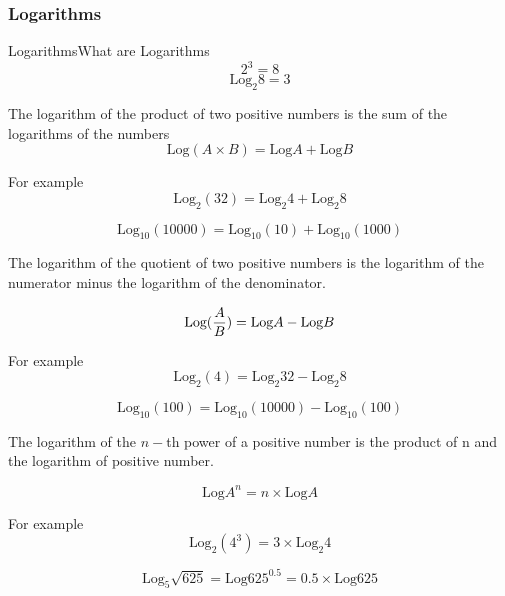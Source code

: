 \frametitle{Logarithms}
{Logarithms}{What are Logarithms}
\Large
\[ 2^3 =8 \]
\[ \mbox{Log}_2 8 = 3 \]




The logarithm of the product of two positive numbers is the sum of the logarithms of the numbers
\[ \mbox{Log}(A\times B) =  \mbox{Log}A +  \mbox{Log}B \]

For example
\[ \mbox{Log}_2(32) =  \mbox{Log}_2 4 +  \mbox{Log}_2 8 \]

\[ \mbox{Log}_{10}(10000) =  \mbox{Log}_{10}(10) +  \mbox{Log}_{10}(1000) \]


The logarithm of the quotient of two positive numbers is the logarithm of the numerator minus the logarithm of the 
denominator.

\[ \mbox{Log}( {A \over B} ) =  \mbox{Log}A -  \mbox{Log}B \]

For example
\[ \mbox{Log}_2(4) =  \mbox{Log}_2 32 -  \mbox{Log}_2 8 \]

\[ \mbox{Log}_{10}(100) =  \mbox{Log}_{10}(10000) -  \mbox{Log}_{10}(100) \]


The logarithm of the $n-$th power of a positive number is the product of n and the logarithm of positive number.

\[ \mbox{Log}A^n =  n\times \mbox{Log}A  \]

For example
\[ \mbox{Log}_2(4^3) =  3 \times \mbox{Log}_2 4 \]

\[ \mbox{Log}_5 \sqrt{625} =  \mbox{Log}625^{0.5} =  0.5 \times \mbox{Log} 625 \]
